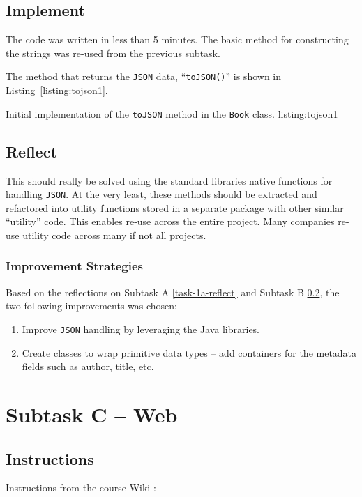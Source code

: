 \subsection{Implement}\label{task-1b-implement}
The code was written in less than 5 minutes. The basic method for
constructing the strings was re-used from the previous subtask.

The method that returns the \texttt{JSON} data, ``\texttt{toJSON()}'' is shown
in Listing~\ref{listing:tojson1}.

           {Initial implementation of the \texttt{toJSON\(\)} method in the
            \texttt{Book} class.}
           {listing:tojson1}


\subsection{Reflect}\label{task-1b-reflect}
This should really be solved using the standard libraries native functions for
handling \texttt{JSON}. 
At the very least, these methods should be extracted and refactored into
utility functions stored in a separate package with other similar ``utility''
code.  This enables re-use across the entire project. Many companies re-use
utility code across many if not all projects.


\subsubsection{Improvement Strategies}
Based on the reflections on Subtask A \ref{task-1a-reflect} and Subtask B
\ref{task-1b-reflect}, the two following improvements was chosen:

\begin{enumerate}
  \item Improve \texttt{JSON} handling by leveraging the Java libraries.
  \item Create classes to wrap primitive data types -- add containers for the
        metadata fields such as author, title, etc.
\end{enumerate}



\section{Subtask C -- Web}\label{subtask-c-web}
\subsection{Instructions}\label{task-1-instructions}
Instructions from the course Wiki \cite{1dv600:lab1:instructions}:

